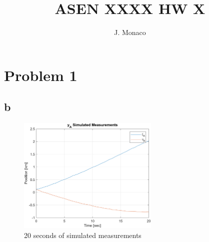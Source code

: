 \documentclass[12pt]{article}
\title{ASEN XXXX HW X}
\author{J. Monaco}
\begin{document}
\maketitle
\thispagestyle{fancy} 
\tableofcontents
\newpage
%
\section{Problem 1}
\subsection{b}
\begin{figure}[h!tbp]
    \centering
    \includegraphics[width=0.6\textwidth]{figs/p2pa.png}
    \caption{20 seconds of simulated measurements}
    \label{fig:p2_a}
\end{figure}
\end{document}
